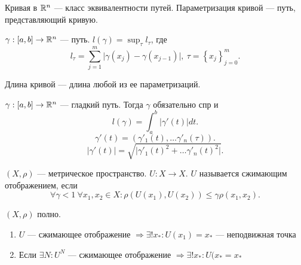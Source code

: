 \documentclass[10pt,dvipsnames]{report}
\begin{document}
\begin{defn}[Кривая]
    {\sf Кривая в $ \mathbb{R}^{n} $} --- класс эквивалентности путей.
    {\sf Параметризация кривой} --- путь, представляющий кривую.  
\end{defn}

\begin{defn}
$ \gamma: [a, b] \to  \mathbb{R}^{n} $ --- путь. $ l(\gamma) = \sup_{\tau} l_{\tau}$, где   
\[
    l_{\tau} = \sum_{j=1}^{m} \lvert \gamma(x_j) -\gamma(x_{j-1}) \rvert, ~ \tau =  \left\{ x_j \right\}_{j=0}^{m}  
.\] 
\end{defn}

\begin{defn}
    {\sf Длина кривой} --- длина любой из ее параметризаций.  
\end{defn}

\begin{thm}
    $ \gamma : [a, b] \to  \mathbb{R}^{n} $ --- гладкий путь. Тогда $ \gamma$ обязательно спр и \[
	l(\gamma) = \int_{a}^{b} \left| \gamma'(t) \right| dt 
    .\] 
    \[
	\gamma'(t) = \left( \gamma'_1(t), \ldots   \gamma'_n(\tau)\right) 
    .\] 
    \[
	\lvert \gamma'(t) \rvert = \sqrt {\lvert \gamma'_1(t)^2 + \ldots  \gamma'_n(t)^2 \rvert }
    .\] 
\end{thm}


\begin{defn}
    $ (X, \rho)$ --- метрическое пространство. $ U: X \to  X$. $ U$ называется {\sf сжимающим отображением}, если
    \[
	\forall  \gamma < 1 ~ \forall  x_1, x_2 \in X\colon \rho(U(x_1), U(x_2)) \le  \gamma \rho(x_1, x_2)
    .\]
\end{defn}

\begin{thm}
    $ (X, \rho)$ полно.
    $ $
    \begin{enumerate}
	\item $ U$ --- сжимающее отображение $ \Longrightarrow \exists! x_{*} \colon U(x_1) = x_{*}$ --- неподвижная точка
	\item Если  $ \exists  N \colon U^{N}$ --- сжимающее отображение $ \Longrightarrow \exists  ! x_{*} \colon U(x_{*} = x_{*}$
    \end{enumerate}
\end{thm}
\end{document}
